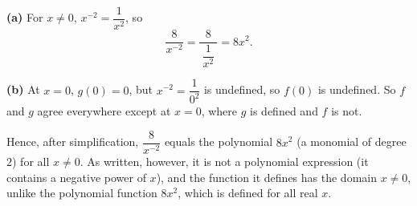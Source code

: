 \textbf{(a)} For $x\ne0$, $x^{-2}=\dfrac1{x^2}$, so
\[\dfrac{8}{x^{-2}}=\dfrac{8}{\ \dfrac1{x^2}\ }=8x^2.\]

\textbf{(b)} At $x=0$, $g(0)=0$, but $x^{-2}=\dfrac1{0^2}$ is undefined, so $f(0)$ is undefined. So $f$ and $g$ agree everywhere except at $\boxed{x=0}$, where $g$ is defined and $f$ is not.

Hence, after simplification, $\dfrac{8}{x^{-2}}$ equals the polynomial $8x^2$ (a monomial of degree $2$) for all $x\ne0$. As written, however, it is not a polynomial expression (it contains a negative power of $x$), and the function it defines has the domain $x\ne0$, unlike the polynomial function $8x^2$, which is defined for all real $x$.
